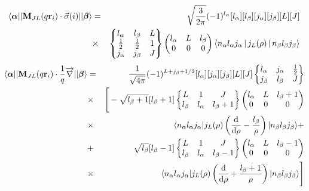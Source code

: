 \documentclass[11pt,a4paper]{article}
\begin{document}
\begin{eqnarray}
\label{eq:m2}
  \langle \boldsymbol{\alpha}||{\bf{M}}_{JL}(q{\bf{r}}_i)\cdot{\vec{\sigma}(i)}||\boldsymbol{\beta}\rangle &=& 
  \sqrt{\frac{3}{2\pi}}(-1)^{l_\alpha}[l_\alpha][l_\beta][j_\alpha][j_\beta][L][J] \nonumber\\
  &\times&
  \begin{Bmatrix}
    l_\alpha&l_\beta&L\\
    \frac{1}{2}&\frac{1}{2}&1\\
    j_\alpha&j_\beta&J
  \end{Bmatrix}
  \begin{pmatrix}
    l_\alpha&L&l_\beta\\
    0&0&0
  \end{pmatrix}\Braket{n_\alpha l_\alpha j_\alpha|j_{L}(\rho)|n_\beta l_\beta j_\beta} \nonumber \\
\end{eqnarray}
\begin{eqnarray}
\label{eq:m3}
  \langle \boldsymbol{\alpha}||{\bf{M}}_{JL}(q{\bf{r}}_i)\cdot\frac{1}{q} \overrightarrow{\nabla}||\boldsymbol{\beta}\rangle &=& 
  \frac{1}{\sqrt{4\pi}} (-1)^{L+j_\beta+1/2}[l_\alpha][j_\alpha][j_\beta][L][J] 
  \begin{Bmatrix}
    l_\alpha&j_\alpha&\frac{1}{2}\\
    j_\beta&l_\beta&J
  \end{Bmatrix}\nonumber\\
&\times&\Bigg[-\sqrt{l_\beta+1}[l_\beta+1]
\begin{Bmatrix}
    L&1&J\\
    l_\beta&l_\alpha&l_\beta+1
  \end{Bmatrix}
  \begin{pmatrix}
    l_\alpha&L&l_\beta+1\\
    0&0&0
  \end{pmatrix} \nonumber\\
 &\times& \langle n_\alpha l_\alpha j_\alpha |j_{L}(\rho)\left(\frac{\text{d}}{\text{d}\rho}-\frac{l_\beta}{\rho}\right)| n_\beta l_\beta j_\beta\rangle + \nonumber\\
 &+&\sqrt{l_\beta}[l_\beta-1]
\begin{Bmatrix}
    L&1&J\\
    l_\beta&l_\alpha&l_\beta-1
  \end{Bmatrix}
  \begin{pmatrix}
    l_\alpha&L&l_\beta-1\\
    0&0&0
  \end{pmatrix}\nonumber\\
  &\times&\langle n_\alpha l_\alpha j_\alpha |j_{L}(\rho)\left(\frac{\text{d}}{\text{d}\rho}+\frac{l_\beta+1}{\rho}\right)|n_\beta l_\beta j_\beta \rangle \Bigg] \nonumber\\
\end{eqnarray}
\end{document}
